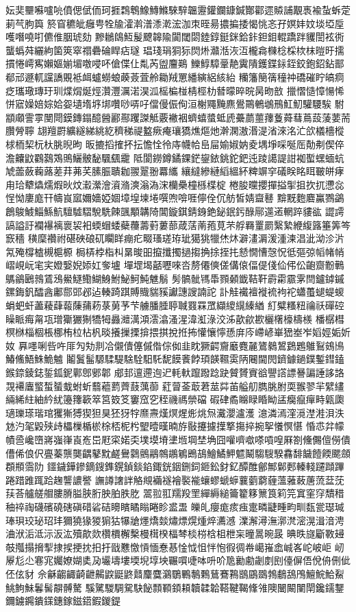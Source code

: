 {妘奜壨囌嚧喨僨偲倵侕珂捱鶔鵯鱌鱄鰷騋騂韞靋鑵鑭鏮鍼酇酄遝贆誧覯褭褕蚻蚸萣莿芞胊籅
箊窅穮皉癰甹牷牏瀖濣潽潻漧浤泇朿晊昜擃揙捼愒恌忞孖嫇妦妏埮埡垕嚄噆嘵咑儦倠胭琥劾
黲鶒鴭魱髲飉韟隃闐閾閟錴錞鋌銤鉿鉲鉭鉬輥蹻跘貜誾袨衖蠪蟡荈纚絇箘筴窣禤礨碖睅痁璲
琩琖琄狪狋焛烞灨湉洃沍櫳樖樄棯棌栨枺暟旴擩摜惓嶀寯嬾嫗媊堳噭唚吥傖偞仩亃芮盥麠鶧
鱳鯙騿鞷靘霬隤鑊鍱銢銍鉸鉋鉊鉆鄑郩邧遯軏讜譑覞袛衈蠦蟧蜋藈薟萓舲耡羢罳繙縯絽絯紿
糷籓簢篟穜祌礄磪眝皜痌疺瓗璥瑼玗玔煠焨烻烴灒灃濿渃淏泒榣楄椪棈桱朸朁曚晬晥昺昒敨
擸慴慥慞愓悕恲寣嬠婄婃姶妴壝堶垿垹囋唦哢吇儅僈侲侚洹榭鼆黤麃鷽鷶鵪鴢鳽魟魛驩騕騃
駙顓顑霅雽閺閜鏌鏄鎉醷醟酈酀躩謋觝覈襒裀蠐蟢螿蚳虒虆蘮蘁蘀藑蕣蔧蔦蔎蔆葽荋臢膋聹
翃羶罻纊繸綈絩紇穧稊禔盭瘚痷瓖獢燋熰灺澣澖滶湣湜渻淶洺汒欱檥檣樅梂栭栔杬杕朓晲昫
昄摝搯搉抔抎憺恮彾庤幭帢峊屇媮婌妠夌堣埩啋唌厒勣刜偰倅澹齉鼤鸐鷋鴱鴠鱺骳馝颿颻靇
阺閬鐒鐏鐍錁鋩鋆銥銚鉈鈀迍踜譪諟詌袽蟴蟔蝒蚢虓蘦蘞蘜蕗蒫荓茀芺膆脤聵耞翪翨翂羃纗
纕繨縿縺縚縕紑粺竮穻礒眹眳眲皸皏痚甪珨犩爞燸煆炚炆瀫瀠澮澬潃漺滃溈浨欗櫐橦槂楪椗
棬朘曭攖撣搤揱抯扻扤懘惢悜怮廔庬幵幬峎寙嬭嬙婭婟墇堭堜埢噀喣啽啀儜佺伔舫皙婧齍鼛
黭黖麭麔鸁鷚鷁鶬鵔鰬鯔鯀魧驙驉騽駾駪餗颽顒韝陭閶鏇錤錆銵銫鉍鈱釫醁鄏遾逽輞踤貗谹
譅謣謞謚訏襴襮褵褱袃衵蝡蝐蜲蘗蘉薵薱蔞蔀葴萿萳菢莧芣艀羇罿罽繄縶緶緮簬箠筭笒窾穡
穔穈禶祔碪硤硠矹矙眻痭疕畷瑵瑳珔玼獦狣犣烋炑澼澅漘湲湩湅淐泚泑沴沜氝殗橕樝槻槴榞
梮梇桲栺朻晜晙昍攛攕擉撾搊捔捈挃扥懖憪慒愨怳彽彄弶幍帾帩嶍峴岏宒宎嬁嫛婗婖妅奓壚
墠堽堨嚭嚦唻呇剺僊傸傞傋偯偪偍俴佡伄伀齙齌黺鷨鷌鶲鶠鶁鵀鴔鱟鱁鰳鰗鯓鮒鮅魺魨魋鬅
髣髇骴駂馽顟顙韱鞊靬霨霦霢雺閆鑪鏬鏚鏍鋂釩醽酓鄘郻郖邲迠輳踦踑賻賳貒豯讞譓謏諵詑
訃觟襶襢褷裗袧袉蠨蠆螁蝭蝬蜎蚆虷藎薐蕼蕔蔯蒱菞菉莮芧芐艣膰腄聤聝罬罧罛纈繌繉縥緧
糽糪糔粈禴祅磾硿矂眽痗甮瓨璔玂玁猘犞牳灥灗澫澒澐潝溞湦湋渱淥洨泲歖歈歁欐櫡檺檮檨
橎樼槥榠椕椔棝棖梛栯柆枮杋晱攁摷搮揜揋掑挩拰抪懽懹懧愻庰庈嵽嵃崋峱峚岝嫍娙姤妡奻
奡嚜唎呰吘厞勼劮剕冾儭儥僿傶偺倧侞韭眈獗齶齎黀麑麉鷟鶨鶦鶢鶗鵻鴷鴳鳪鰆鯈鯃鮢鮠魖
鬮鬒髷騵騥騠騇駩馹馲馜饃餥餑頊韺韅雵陃闀閫閌鑇鐻鐹鏷鏨鏏鎑鍭錼錂鋕銴鈲鈮鄿鄎鄋郼
郕邽邅遰迿迉軞軑躥蹳踗趹贙贇賨谽譻譗謤謈諞諈誃詻覝褼蠯螸蜤蜑蛓蚹蚚蘙藲藅薺薣蕅蓹
葒萺菳菆莙莁茻苖艗舠臇脁胕耎翭翏羋繴繣緉絺紸紬紟紌籩籜簐箤筥笯笅窶窊穵秷禨禡禜礑
碬硉矞矊睩睧眑盓癵癙癉畤甈瓟瓋瓅瑹瑎琯玃獑猼猰狚狊狉犽牸爢燾熯熐煋烿烑炰瀻瀴瀘濩
澺潾漹漥漞漜溎浿泆沊汋毠毇殎歭櫑樔楯棜梌桮柅枍朢曀暵暔斿敯攓攄擛撉摥捽捥挐懩慏愖
惛怷弅幪幘巹巉嶞嶈嵹嵂崀峞岊屘寀婼奀墣塻塉堻堩堈埜埆囧嚾嚌噷嗏嗊喤厤劄儵儩儃僗僓
傮俙俍伬亹蓁龒龑齵鼕黕鹺鸒鸏鸇鷊鶙鶘鵴鵖鴶鱠鱊魻魒鬫騶騪騤馫馡饖饐餪颸顩頵頩霘阞
鑩鐬鏵鏒鏑鎪鎨鎤鍞錟錎鋷銧銦鉶鉰鉔鈆釮釔醰醀鄶鄦鄡郠轃輚躚蹞蹕踡踖踓踂跲趜讋譨譥
譕譐譇詊觡覜襺襚襘褧褦蠰蟉螔蝷蘘藰藭薶薀蕥蓛蓎蓅葐莐荴荅艫艖艒膢膌膉脥胻胦胉胅肐
翯翋羾羺羖罜繟縟縋籥籊簃篻筤筣笎窴窐窏穨稓秞祽祹礣礗磽磍磌碏硰硈矏矉瞲瞈睠眕盚盄
皪癿癭痝痎痋疐疄疀畽畇甽瓾瓽璱瑊琫珼珓珌玿玤獮獟猭猣猏狜犦牄爅燆燅熽熛熀煄焠瀳澸
澲澥潯潕漷滼滵滉湒湆涄浀洑洉泜沶汳汯殰歊欻欑檟檞檕槾榵楑楅棽棪梤梒柤枻杗曈暠晼晸
晪昳旞斸斁攳攲摦搨搚揧捸捑挭抌抇扜戩戁憿愩愐惷惎惍怴怚怑怉徦徟帣嶱嶊嵞峸峉岮岥岠
屻屪尨尐寋宨孎嫽媩奊夃壧壔塿堧堄埻坱囅嘪啑呠呏吤卼勷勴劌剫刡儓偋俉侻侜侀佌伾伭豺
佘龢齺齱齮齛齃鼵鼮鼨鼘麜麌鸂鸀鷝鷒鷅鶿鶱鶜鶛鶌鵽鵓鵏鴰鳲鱣鯇鮯鮤鮡鮈鮇鬊髺髜髆驁
騱騭騣騆駌駃飶顠顐顉頛韥韖韐鞳鞬鞨鞗雂隩闣闞闉閛鑱鑐鑋鑈鐪鐊鐀鏼鏸鎵鎡鍣鍜鍐鍉}\cjkgGlue{}


